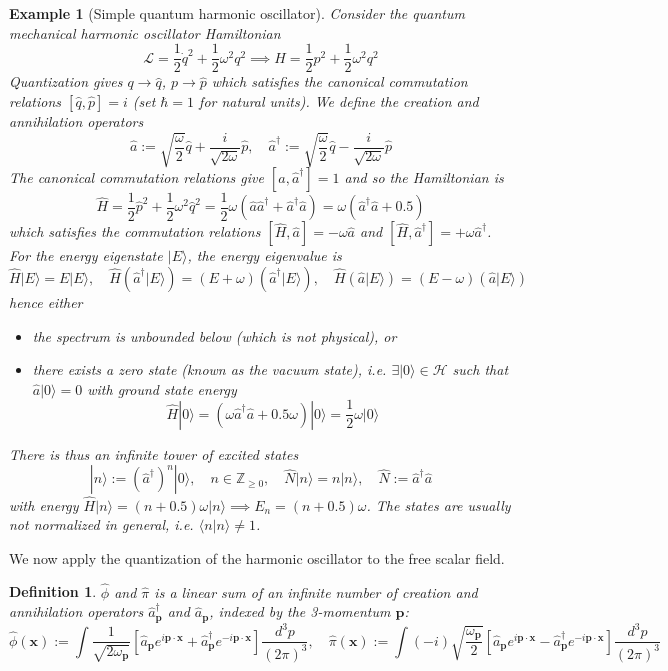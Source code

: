 \documentclass[a4paper]{article}
\newtheorem{eg}{Example}[section]
\theoremstyle{new}
\newtheorem{defi}{Definition}[section]
\begin{document}
\begin{eg}[Simple quantum harmonic oscillator]
Consider the quantum mechanical harmonic oscillator Hamiltonian
$$\mathcal{L}=\frac{1}{2}\dot{q}^2+\frac{1}{2}\omega^2q^2\implies H=\frac{1}{2}p^2+\frac{1}{2}\omega^2q^2$$
Quantization gives $q\rightarrow\hat{q}$, $p\rightarrow\hat{p}$ which satisfies the canonical commutation relations $[\hat{q},\hat{p}]=i$ (set $\hbar=1$ for natural units). We define the creation and annihilation operators
$$\hat{a}:=\sqrt{\frac{\omega}{2}}\hat{q}+\frac{i}{\sqrt{2\omega}}\hat{p},\quad\hat{a}^\dag:=\sqrt{\frac{\omega}{2}}\hat{q}-\frac{i}{\sqrt{2\omega}}\hat{p}$$
The canonical commutation relations give $[\hat{a},\hat{a}^\dag]=1$ and so the Hamiltonian is
$$\hat{H}=\frac{1}{2}\hat{p}^2+\frac{1}{2}\omega^2\hat{q}^2=\frac{1}{2}\omega(\hat{a}\hat{a}^\dag+\hat{a}^\dag\hat{a})=\omega(\hat{a}^\dag\hat{a}+0.5)$$
which satisfies the commutation relations $[\hat{H},\hat{a}]=-\omega\hat{a}$ and $[\hat{H},\hat{a}^\dag]=+\omega\hat{a}^\dag$. For the energy eigenstate $|E\rangle$, the energy eigenvalue is
$$\hat{H}|E\rangle=E|E\rangle,\quad\hat{H}(\hat{a}^\dag|E\rangle)=(E+\omega)(\hat{a}^\dag|E\rangle),\quad\hat{H}(\hat{a}|E\rangle)=(E-\omega)(\hat{a}|E\rangle)$$
hence either
\begin{itemize}
    \item the spectrum is unbounded below (which is not physical), or
    \item there exists a zero state (known as the vacuum state), i.e. $\exists|0\rangle\in\mathcal{H}$ such that $\hat{a}|0\rangle=0$ with ground state energy
    $$\hat{H}|0\rangle=(\omega\hat{a}^\dag\hat{a}+0.5\omega)|0\rangle=\frac{1}{2}\omega|0\rangle$$
\end{itemize}
There is thus an infinite tower of excited states
$$|n\rangle:=(\hat{a}^\dag)^n|0\rangle,\quad n\in\mathbb{Z}_{\geq0},\quad\hat{N}|n\rangle=n|n\rangle,\quad\hat{N}:=\hat{a}^\dag\hat{a}$$
with energy $\hat{H}|n\rangle=(n+0.5)\omega|n\rangle\implies E_n=(n+0.5)\omega$. The states are usually not normalized in general, i.e. $\langle n|n\rangle\neq1$.
\end{eg}
We now apply the quantization of the harmonic oscillator to the free scalar field. 
\begin{defi}
$\hat{\phi}$ and $\hat{\pi}$ is a linear sum of an infinite number of creation and annihilation operators $\hat{a}^\dag_{\mathbf{p}}$ and $\hat{a}_{\mathbf{p}}$, indexed by the 3-momentum $\mathbf{p}$:
$$\hat{\phi}(\mathbf{x}):=\int\frac{1}{\sqrt{2\omega_{\mathbf{p}}}}[\hat{a}_{\mathbf{p}}e^{i\mathbf{p}\cdot\mathbf{x}}+\hat{a}_{\mathbf{p}}^\dag e^{-i\mathbf{p}\cdot\mathbf{x}}]\frac{d^3p}{(2\pi)^3},\quad\hat{\pi}(\mathbf{x}):=\int(-i)\sqrt{\frac{\omega_{\mathbf{p}}}{2}}[\hat{a}_{\mathbf{p}}e^{i\mathbf{p}\cdot\mathbf{x}}-\hat{a}_{\mathbf{p}}^\dag e^{-i\mathbf{p}\cdot\mathbf{x}}]\frac{d^3p}{(2\pi)^3}$$
\end{defi}
\end{document}
